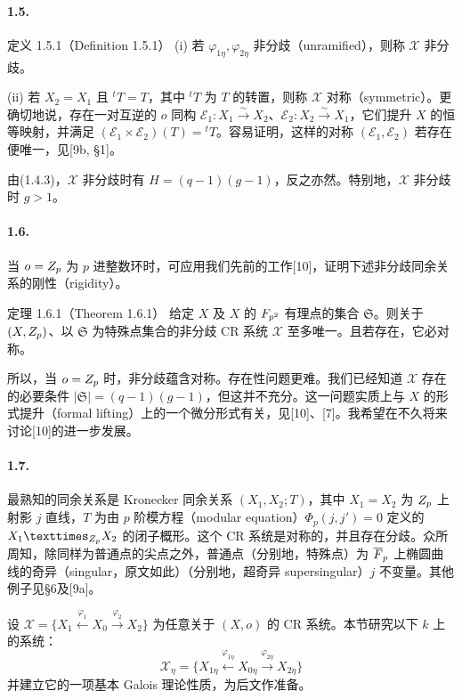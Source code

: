 \paragraph*{1.5.}
\begin{originaltheorem}{定义 1.5.1（Definition 1.5.1）}
(i) 若 $\varphi_{1\eta},\varphi_{2\eta}$ 非分歧（unramified），则称 $\mathcal X$ 非分歧。

(ii) 若 $X_2=X_1$ 且 ${}^tT=T$，其中 ${}^tT$ 为 $T$ 的转置，则称 $\mathcal X$ 对称（symmetric）。更确切地说，存在一对互逆的 $o$ 同构 $\mathcal E_1:X_1\xrightarrow{\sim}X_2$、$\mathcal E_2:X_2\xrightarrow{\sim}X_1$，它们提升 $X$ 的恒等映射，并满足 $(\mathcal E_1\times\mathcal E_2)(T)={}^tT$。容易证明，这样的对称 $(\mathcal E_1,\mathcal E_2)$ 若存在便唯一，见[9b, §1]。
\end{originaltheorem}
由(1.4.3)，$\mathcal X$ 非分歧时有 $H=(q-1)(g-1)$，反之亦然。特别地，$\mathcal X$ 非分歧时 $g>1$。

\paragraph*{1.6.}
当 $o=Z_p$ 为 $p$ 进整数环时，可应用我们先前的工作[10]，证明下述非分歧同余关系的刚性（rigidity）。
\begin{originaltheorem}{定理 1.6.1（Theorem 1.6.1）}
给定 $X$ 及 $X$ 的 $F_{p^2}$ 有理点的集合 $\mathfrak S$。则关于 $(X,Z_p)$、以 $\mathfrak S$ 为特殊点集合的非分歧 CR 系统 $\mathcal X$ 至多唯一。且若存在，它必对称。
\end{originaltheorem}
所以，当 $o=Z_p$ 时，非分歧蕴含对称。存在性问题更难。我们已经知道 $\mathcal X$ 存在的必要条件 $|\mathfrak S|=(q-1)(g-1)$，但这并不充分。这一问题实质上与 $X$ 的形式提升（formal lifting）上的一个微分形式有关，见[10]、[7]。我希望在不久将来讨论[10]的进一步发展。

\paragraph*{1.7.}
最熟知的同余关系是 Kronecker 同余关系 $(X_1,X_2;T)$，其中 $X_1=X_2$ 为 $Z_p$ 上射影 $j$ 直线，$T$ 为由 $p$ 阶模方程（modular equation）$\Phi_p(j,j')=0$ 定义的 $X_1\times_{\Z_p}X_2$ 的闭子概形。这个 CR 系统是对称的，并且存在分歧。众所周知，除同样为普通点的尖点之外，普通点（分别地，特殊点）为 $\overline{F}_p$ 上椭圆曲线的奇异（singular，原文如此）（分别地，超奇异 supersingular）$j$ 不变量。其他例子见§6及[9a]。

设 $\mathcal X=\{X_1\xleftarrow{\varphi_1}X_0\xrightarrow{\varphi_2}X_2\}$ 为任意关于 $(X,o)$ 的 CR 系统。本节研究以下 $k$ 上的系统：
\[
 \mathcal X_\eta=\{X_{1\eta}\xleftarrow{\varphi_{1\eta}}
 X_{0\eta}\xrightarrow{\varphi_{2\eta}}X_{2\eta}\}
\]
并建立它的一项基本 Galois 理论性质，为后文作准备。

